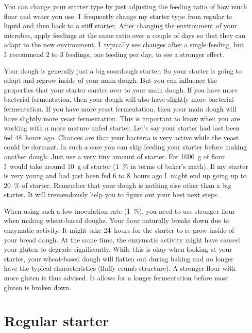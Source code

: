 You can change your starter type by just adjusting the feeding ratio of how
much flour and water you use. I~frequently change my starter type from
regular to liquid and then back to a stiff starter. After changing the
environment of your microbes, apply feedings at the same ratio over a couple of
days so that they can adapt to the new environment. I~typically see
changes after a single feeding, but I~recommend 2 to 3 feedings, one feeding per
day, to see a stronger effect.

Your dough is generally just a big sourdough starter. So your starter is going
to adapt and regrow inside of your main dough. But you can influence the
properties that your starter carries over to your main dough. If you have more
bacterial fermentation, then your dough will also have slightly more bacterial
fermentation. If you have more yeast fermentation, then your main dough will
have slightly more yeast fermentation. This is important to know when you are
working with a more mature unfed starter. Let's say your starter had last been
fed 48~hours ago. Chances are that your bacteria is very active while the
yeast could be dormant. In such a case you can skip feeding your starter
before making another dough. Just use a very tiny amount of starter. For \qty{1000}{\gram}
of flour I~would take around \qty{10}{\gram} of starter (\qty{1}{\percent} in terms of baker's
math). If my starter is very young and had just been fed 6 to 8~hours ago I~might
end up going up to \qty{20}{\percent} of starter. Remember that your dough is nothing
else other than a big starter. It will tremendously help you to figure out
your best next steps.

When using such a low inoculation rate (\qty{1}{\percent}), you need to use stronger
flour when making wheat-based doughs. Your flour naturally breaks down due
to enzymatic activity. It might take 24~hours for the starter to re-grow
inside of your bread dough. At the same time, the enzymatic activity might
have caused your gluten to degrade significantly. While this is okay
when looking at your starter, your wheat-based dough will flatten
out during baking and no longer have the typical characteristics (fluffy crumb
structure). A stronger flour with more gluten is thus advised. It allows for
a longer fermentation before most gluten is broken down.

\section{Regular starter}

